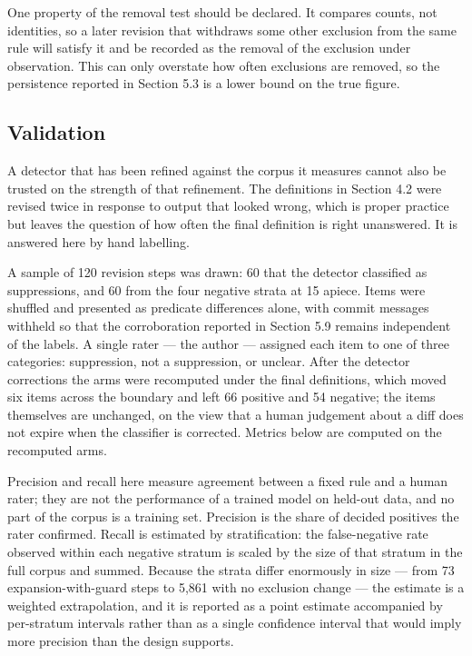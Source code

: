 One property of the removal test should be declared. It compares counts, not identities, so a later revision that withdraws some other exclusion from the same rule will satisfy it and be recorded as the removal of the exclusion under observation. This can only overstate how often exclusions are removed, so the persistence reported in Section 5.3 is a lower bound on the true figure.

\subsection{Validation}
\label{sec:validation}

A detector that has been refined against the corpus it measures cannot also be trusted on the strength of that refinement. The definitions in Section 4.2 were revised twice in response to output that looked wrong, which is proper practice but leaves the question of how often the final definition is right unanswered. It is answered here by hand labelling.

A sample of 120 revision steps was drawn: 60 that the detector classified as suppressions, and 60 from the four negative strata at 15 apiece. Items were shuffled and presented as predicate differences alone, with commit messages withheld so that the corroboration reported in Section 5.9 remains independent of the labels. A single rater --- the author --- assigned each item to one of three categories: suppression, not a suppression, or unclear. After the detector corrections the arms were recomputed under the final definitions, which moved six items across the boundary and left 66 positive and 54 negative; the items themselves are unchanged, on the view that a human judgement about a diff does not expire when the classifier is corrected. Metrics below are computed on the recomputed arms.

Precision and recall here measure agreement between a fixed rule and a human rater; they are not the performance of a trained model on held-out data, and no part of the corpus is a training set. Precision is the share of decided positives the rater confirmed. Recall is estimated by stratification: the false-negative rate observed within each negative stratum is scaled by the size of that stratum in the full corpus and summed. Because the strata differ enormously in size --- from 73 expansion-with-guard steps to 5,861 with no exclusion change --- the estimate is a weighted extrapolation, and it is reported as a point estimate accompanied by per-stratum intervals rather than as a single confidence interval that would imply more precision than the design supports.

